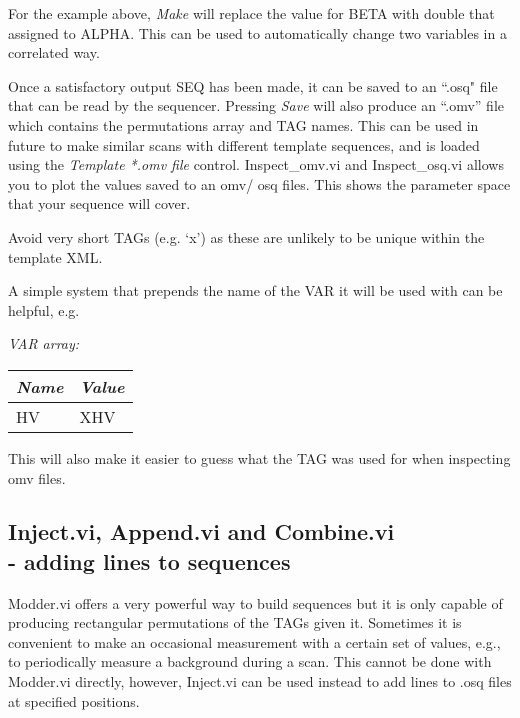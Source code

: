 \documentclass[10pt,a4paper]{article}
\newenvironment{warning}[1]{%
	\tcolorbox[beamer,%
	breakable,
	colback=white,colframe=DarkRed,%
	title=Warning:]}%
{\endtcolorbox}
\begin{document}
\noindent For the example above, \emph{Make} will replace the value for BETA with double that assigned to ALPHA.  This can be used to automatically change two variables in a correlated way.

Once a satisfactory output SEQ has been made, it can be saved to an ``.osq" file that can be read by the sequencer.  Pressing \emph{Save} will also produce an ``.omv'' file which contains the permutations array and TAG names.  This can be used in future to make similar scans with different template sequences, and is loaded using the \emph{Template *.omv file} control.  Inspect\_omv.vi and Inspect\_osq.vi allows you to plot the values saved to an omv/ osq files. This shows the parameter space that your sequence will cover.

\begin{warning} {}
	Avoid very short TAGs  (e.g. `x') as these are unlikely to be unique within the template XML.
	
	A simple system that prepends the name of the VAR it will be used with can be helpful, e.g.

	\hangindent=0.7cm
	\emph{VAR array:} \\
	\begin{tabularx}{0.5\textwidth}{X|X}
		\emph{Name} & \emph{Value} \\
		\hline
		HV & XHV \\
	\end{tabularx}
	\vspace{2mm}
	
	This will also make it easier to guess what the TAG was used for when inspecting omv files.
\end{warning}

\subsection[Inject.vi, Append.vi and Combine.vi]{Inject.vi, Append.vi and Combine.vi\\ %
	\normalsize - adding lines to sequences}
Modder.vi offers a very powerful way to build sequences but it is only capable of producing rectangular permutations of the TAGs given it.  Sometimes it is convenient to make an occasional measurement with a certain set of values, e.g., to periodically measure a background during a scan.  This cannot be done with Modder.vi directly, however, Inject.vi can be used instead to add lines to .osq files at specified positions.
\end{document}
